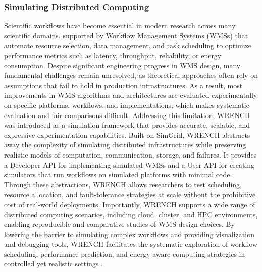 \subsubsection{Simulating Distributed Computing}
\label{sec:background_simulation}
Scientific workflows have become essential in modern research across many scientific domains, supported by Workflow Management Systems (WMSs) that automate resource selection, data management, and task scheduling to optimize performance metrics such as latency, throughput, reliability, or energy consumption. Despite significant engineering progress in WMS design, many fundamental challenges remain unresolved, as theoretical approaches often rely on assumptions that fail to hold in production infrastructures. As a result, most improvements in WMS algorithms and architectures are evaluated experimentally on specific platforms, workflows, and implementations, which makes systematic evaluation and fair comparisons difficult. Addressing this limitation, WRENCH was introduced as a simulation framework that provides accurate, scalable, and expressive experimentation capabilities. Built on SimGrid, WRENCH abstracts away the complexity of simulating distributed infrastructures while preserving realistic models of computation, communication, storage, and failures. It provides a Developer API for implementing simulated WMSs and a User API for creating simulators that run workflows on simulated platforms with minimal code. Through these abstractions, WRENCH allows researchers to test scheduling, resource allocation, and fault-tolerance strategies at scale without the prohibitive cost of real-world deployments. Importantly, WRENCH supports a wide range of distributed computing scenarios, including cloud, cluster, and HPC environments, enabling reproducible and comparative studies of WMS design choices. By lowering the barrier to simulating complex workflows and providing visualization and debugging tools, WRENCH facilitates the systematic exploration of workflow scheduling, performance prediction, and energy-aware computing strategies in controlled yet realistic settings \cite{wrench}.





